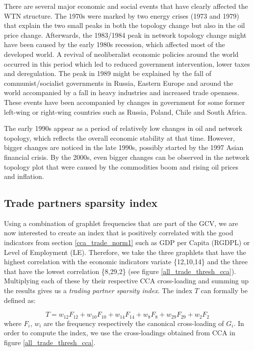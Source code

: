 There are several major economic and social events that have clearly affected the WTN structure. The 1970s were marked by two energy crises (1973 and 1979) that explain the two small peaks in both the topology change but also in the oil price change. Afterwards, the 1983/1984 peak in network topology change might have been caused by the early 1980s recession, which affected most of the developed world. A revival of neoliberalist economic policies around the world occurred in this period which led to reduced government intervention, lower taxes and deregulation. The peak in 1989 might be explained by the fall of communist/socialist governments in Russia, Eastern Europe and around the world accompanied by a fall in heavy industries and increased trade openness. These events have been accompanied by changes in government for some former left-wing or right-wing countries such as Russia, Poland, Chile and South Africa.

The early 1990s appear as a period of relatively low changes in oil and network topology, which reflects the overall economic stability at that time. However, bigger changes are noticed in the late 1990s, possibly started by the 1997 Asian financial crisis. By the 2000s, even bigger changes can be observed in the network topology plot that were caused by the commodities boom and rising oil prices and inflation. 

\subsection{Trade partners sparsity index}
\label{sec:sparsity_index}

Using a combination of graphlet frequencies that are part of the GCV, we are now interested to create an index that is positively correlated with the good indicators from section \ref{cca_trade_norm1} such as GDP per Capita (RGDPL) or Level of Employment (LE). Therefore, we take the three graphlets that have the highest correlation with the economic indicators variate \{12,10,14\} and the three that have the lowest correlation \{8,29,2\} (see figure \ref{all_trade_thresh_cca}). Multiplying each of these by their respective CCA cross-loading and summing up the results gives us a \emph{trading partner sparsity index}. The index $T$ can formally be defined as:

$$ T = w_{12}F_{12} + w_{10}F_{10} + w_{14}F_{14} + w_{8}F_{8} + w_{29}F_{29} + w_{2}F_{2}$$
where $F_i$, $w_i$ are the frequency respectively the canonical cross-loading of $G_i$. In order to compute the index, we use the cross-loadings obtained from CCA in figure \ref{all_trade_thresh_cca}.


